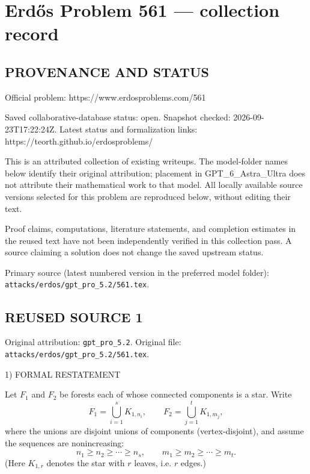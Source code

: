 \section*{Erd\H{o}s Problem 561 --- collection record}

\subsection*{PROVENANCE AND STATUS}
Official problem: https://www.erdosproblems.com/561

Saved collaborative-database status: open.
Snapshot checked: 2026-09-23T17:22:24Z.
Latest status and formalization links: https://teorth.github.io/erdosproblems/

This is an attributed collection of existing writeups. The model-folder names below identify their original attribution; placement in GPT\_6\_Astra\_Ultra does not attribute their mathematical work to that model. All locally available source versions selected for this problem are reproduced below, without editing their text.

Proof claims, computations, literature statements, and completion estimates in the reused text have not been independently verified in this collection pass. A source claiming a solution does not change the saved upstream status.

Primary source (latest numbered version in the preferred model folder): \texttt{attacks/erdos/gpt\_pro\_5.2/561.tex}.

\subsection*{REUSED SOURCE 1}
Original attribution: \texttt{gpt\_pro\_5.2}.
Original file: \texttt{attacks/erdos/gpt\_pro\_5.2/561.tex}.


1) FORMAL RESTATEMENT

Let $F_1$ and $F_2$ be forests each of whose connected components is a star.
Write
\[
F_1=\bigcup_{i=1}^s K_{1,n_i},\qquad F_2=\bigcup_{j=1}^t K_{1,m_j},
\]
where the unions are disjoint unions of components (vertex-disjoint), and assume the sequences are nonincreasing:
\[
n_1\ge n_2\ge \cdots \ge n_s,\qquad m_1\ge m_2\ge \cdots \ge m_t.
\]
(Here $K_{1,r}$ denotes the star with $r$ leaves, i.e. $r$ edges.)

